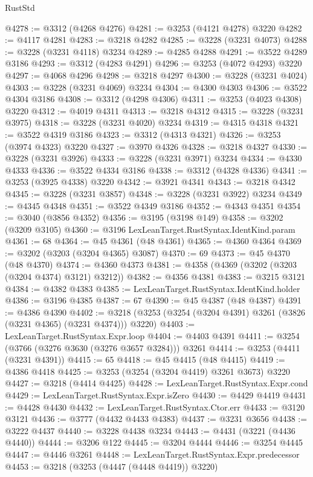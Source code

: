 \begin{lexlean}{RustStd}
\begin{coremodule}
@4278 := @3312 (@4268 @4276)
@4281 := @3253 (@4121 @4278) @3220
@4282 := @4117 @4281
@4283 := @3218 @4282
@4285 := @3228 (@3231 @4073)
@4288 := @3228 (@3231 @4118) @3234
@4289 := @4285 @4288
@4291 := @3522 @4289 @3186
@4293 := @3312 (@4283 @4291)
@4296 := @3253 (@4072 @4293) @3220
@4297 := @4068 @4296
@4298 := @3218 @4297
@4300 := @3228 (@3231 @4024)
@4303 := @3228 (@3231 @4069) @3234
@4304 := @4300 @4303
@4306 := @3522 @4304 @3186
@4308 := @3312 (@4298 @4306)
@4311 := @3253 (@4023 @4308) @3220
@4312 := @4019 @4311
@4313 := @3218 @4312
@4315 := @3228 (@3231 @3975)
@4318 := @3228 (@3231 @4020) @3234
@4319 := @4315 @4318
@4321 := @3522 @4319 @3186
@4323 := @3312 (@4313 @4321)
@4326 := @3253 (@3974 @4323) @3220
@4327 := @3970 @4326
@4328 := @3218 @4327
@4330 := @3228 (@3231 @3926)
@4333 := @3228 (@3231 @3971) @3234
@4334 := @4330 @4333
@4336 := @3522 @4334 @3186
@4338 := @3312 (@4328 @4336)
@4341 := @3253 (@3925 @4338) @3220
@4342 := @3921 @4341
@4343 := @3218 @4342
@4345 := @3228 (@3231 @3857)
@4348 := @3228 (@3231 @3922) @3234
@4349 := @4345 @4348
@4351 := @3522 @4349 @3186
@4352 := @4343 @4351
@4354 := @3040 (@3856 @4352)
@4356 := @3195 (@3198 @149)
@4358 := @3202 (@3209 @3105)
@4360 := @3196 LexLeanTarget.RustSyntax.IdentKind.param
@4361 := 68
@4364 := @45 @4361 (@48 @4361)
@4365 := @4360 @4364
@4369 := @3202 (@3203 (@3204 @4365) @3087)
@4370 := 69
@4373 := @45 @4370 (@48 @4370)
@4374 := @4360 @4373
@4381 := @4358 (@4369 (@3202 (@3203 (@3204 @4374) @3121) @3212))
@4382 := @4356 @4381
@4383 := @3215 @3121
@4384 := @4382 @4383
@4385 := LexLeanTarget.RustSyntax.IdentKind.holder
@4386 := @3196 @4385
@4387 := 67
@4390 := @45 @4387 (@48 @4387)
@4391 := @4386 @4390
@4402 := @3218 (@3253 (@3254 (@3204 @4391) @3261 (@3826 (@3231 @4365) (@3231 @4374))) @3220)
@4403 := LexLeanTarget.RustSyntax.Expr.loop
@4404 := @4403 @4391
@4411 := @3254 (@3766 (@3276 @3630 (@3276 @3657 @3284))) @3261
@4414 := @3253 (@4411 (@3231 @4391))
@4415 := 65
@4418 := @45 @4415 (@48 @4415)
@4419 := @4386 @4418
@4425 := @3253 (@3254 (@3204 @4419) @3261 @3673) @3220
@4427 := @3218 (@4414 @4425)
@4428 := LexLeanTarget.RustSyntax.Expr.cond
@4429 := LexLeanTarget.RustSyntax.Expr.isZero
@4430 := @4429 @4419
@4431 := @4428 @4430
@4432 := LexLeanTarget.RustSyntax.Ctor.err
@4433 := @3120 @3121
@4436 := @3777 (@4432 @4433 @4383)
@4437 := @3231 @3656
@4438 := @3222 @4437
@4440 := @3228 @4438 @3234
@4443 := @4431 (@3221 (@4436 @4440))
@4444 := @3206 @122
@4445 := @3204 @4444
@4446 := @3254 @4445
@4447 := @4446 @3261
@4448 := LexLeanTarget.RustSyntax.Expr.predecessor
@4453 := @3218 (@3253 (@4447 (@4448 @4419)) @3220)

\end{coremodule}
\end{lexlean}
